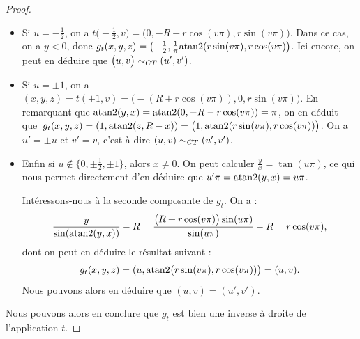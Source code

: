 \documentclass[hidelinks, 10pt]{article}
\begin{document}
\begin{proof}
\begin{itemize}
    \item Si $u=-\frac{1}{2}$, on a $t\big(-\frac{1}{2},v\big)=\big(0,-R-r\cos(v\pi),r\sin(v\pi)\big)$. Dans ce cas, on a $y<0$, donc $g_t(x,y,z)=\left(-\frac{1}{2},\frac{1}{\pi}\mathrm{atan}2(r\sin(v\pi),r\cos(v\pi)\right)$. Ici encore, on peut en déduire que $\big(u,v\big)\sim_{CT}(u',v')$.
    \item Si $u=\pm1$, on a $(x,y,z)=t(\pm1,v)=\big(-(R+r\cos(v\pi)), 0, r\sin(v\pi)\big)$. En remarquant que $\mathrm{atan}2(y,x)=\mathrm{atan}2(0,-R-r\cos(v\pi))=\pi$, on en déduit que~$g_t(x,y,z)=\left(1,\mathrm{atan}2(z,R-x)\right)=\big(1,\mathrm{atan}2(r\sin(v\pi),r\cos(v\pi))\big)$. On a $u'=\pm u$ et $v'=v$, c'est à dire $(u,v)\sim_{CT}(u',v')$.
    \item Enfin si $u\not\in\{0,\pm\frac{1}{2},\pm1\}$, alors $x\neq0$. On peut calculer $\frac{y}{x}=\tan(u\pi)$, ce qui nous permet directement d'en déduire que $u'\pi=\mathrm{atan}2(y,x)=u\pi$.

    Intéressons-nous à la seconde composante de $g_t$. On a : \[\frac{y}{\sin(\mathrm{atan}2(y,x))}-R=\frac{\big(R+r\cos(v\pi)\big)\sin(u\pi)}{\sin(u\pi)}-R=r\cos(v\pi),\]dont on peut en déduire le résultat suivant : $$g_t(x,y,z)=(u,\mathrm{atan}2\big(r\sin(v\pi),r\cos(v\pi))\big)=(u,v).$$Nous pouvons alors en déduire que $(u,v)=(u',v')$.
\end{itemize}
Nous pouvons alors en conclure que $g_t$ est bien une inverse à droite de l'application $t$.
\end{proof}
\end{document}
